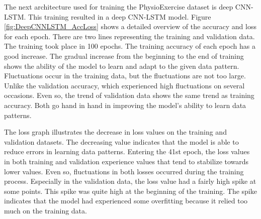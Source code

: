 The next architecture used for training the PhysioExercise dataset is deep CNN-LSTM. This training resulted in a deep CNN-LSTM model. Figure \ref{fig:DeepCNNLSTM_AccLoss} shows a detailed overview of the accuracy and loss for each epoch. There are two lines representing the training and validation data. The training took place in 100 epochs. The training accuracy of each epoch has a good increase. The gradual increase from the beginning to the end of training shows the ability of the model to learn and adapt to the given data pattern. Fluctuations occur in the training data, but the fluctuations are not too large. Unlike the validation accuracy, which experienced high fluctuations on several occasions. Even so, the trend of validation data shows the same trend as training accuracy. Both go hand in hand in improving the model's ability to learn data patterns.

The loss graph illustrates the decrease in loss values on the training and validation datasets. The decreasing value indicates that the model is able to reduce errors in learning data patterns. Entering the 41st epoch, the loss values in both training and validation experience values that tend to stabilize towards lower values. Even so, fluctuations in both losses occurred during the training process. Especially in the validation data, the loss value had a fairly high spike at some points. This spike was quite high at the beginning of the training. The spike indicates that the model had experienced some overfitting because it relied too much on the training data.

